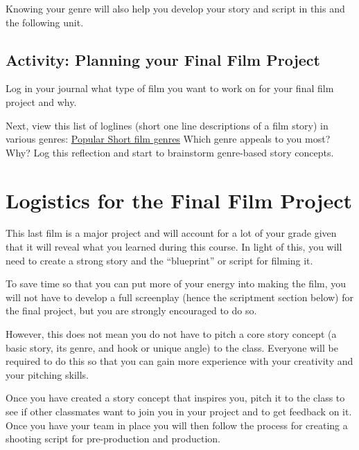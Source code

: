 \documentclass[
]{book}
\begin{document}
Knowing your genre will also help you develop your story and script in this and the following unit.

\hypertarget{activity-planning-your-final-film-project}{%
\subsection*{Activity: Planning your Final Film Project}\label{activity-planning-your-final-film-project}}

\begin{reflect}
Log in your journal what type of film you want to work on for your final film project and why.

Next, view this list of loglines (short one line descriptions of a film story) in various genres: \href{https://www.slideshare.net/BigBadBoobyLady/popular-short-film-genres}{Popular Short film genres} Which genre appeals to you most? Why? Log this reflection and start to brainstorm genre-based story concepts.
\end{reflect}

\hypertarget{logistics-for-the-final-film-project}{%
\section{Logistics for the Final Film Project}\label{logistics-for-the-final-film-project}}

This last film is a major project and will account for a lot of your grade given that it will reveal what you learned during this course. In light of this, you will need to create a strong story and the ``blueprint'' or script for filming it.

To save time so that you can put more of your energy into making the film, you will not have to develop a full screenplay (hence the scriptment section below) for the final project, but you are strongly encouraged to do so.

However, this does not mean you do not have to pitch a core story concept (a basic story, its genre, and hook or unique angle) to the class. Everyone will be required to do this so that you can gain more experience with your creativity and your pitching skills.

Once you have created a story concept that inspires you, pitch it to the class to see if other classmates want to join you in your project and to get feedback on it. Once you have your team in place you will then follow the process for creating a shooting script for pre-production and production.
\end{document}
